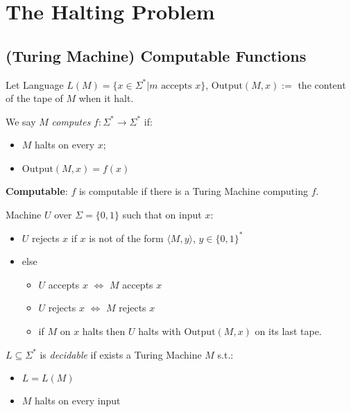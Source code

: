 \section{The Halting Problem}

\subsection{(Turing Machine) Computable Functions}

\begin{definition}[Compute]\mbox{}\par
Let Language
\(L(M) = \{x \in \Sigma^* | m \text{ accepts } x\}\),
\(\text{Output}(M,x) :=\) the content of the tape of \(M\) when it halt.

We say \(M\) \emph{computes} \(f: \Sigma^* \rightarrow \Sigma^*\) if:
\begin{itemize}
    \item
  \(M\) halts on every \(x\);
\item
  \(\text{Output}(M,x) = f(x)\)
\end{itemize}
\textbf{Computable}: \(f\) is computable if there is a Turing Machine
computing \(f\).
\end{definition}

\begin{theorem}
Machine \(U\) over \(\Sigma = \{0,1\}\) such that on input \(x\):
\begin{itemize}
\def\labelenumi{\arabic{enumi}.}
\item
  \(U\) rejects \(x\) if \(x\) is not of the form
  \(\langle M,y\rangle\), \(y \in \{0,1\}^*\)
\item
  else

  \begin{itemize}
  \item
    \(U\) accepts \(x\) \(\Leftrightarrow\) \(M\) accepts \(x\)
  \item
    \(U\) rejects \(x\) \(\Leftrightarrow\) \(M\) rejects \(x\)
  \item
    if \(M\) on \(x\) halts then \(U\) halts with \(\text{Output}(M,x)\)
    on its last tape.
  \end{itemize}
\end{itemize}
\end{theorem}

\begin{definition}[Decidable]
\(L \subseteq \Sigma^*\) is
\emph{decidable} if exists a Turing Machine \(M\) s.t.:

\begin{itemize}
\item
  \(L = L(M)\)
\item
  \(M\) halts on every input
\end{itemize}
\end{definition}

